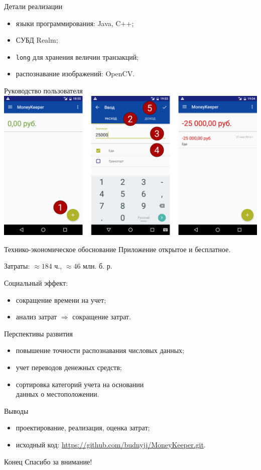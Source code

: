 \documentclass[hyperref={pdftex,unicode}]{beamer}
\begin{document}
\begin{frame}{Детали реализации}
  \begin{itemize}
    \item языки программирования: Java, C++;
    \item СУБД Realm;
    \item \texttt{long} для хранения величин транзакций;
    \item распознавание изображений: OpenCV.
  \end{itemize}
\end{frame}

\begin{frame}{Руководство пользователя}
  \centering
  \includegraphics[width=\textwidth]{fig/implementation_manual_balance_change.eps}
\end{frame}

\begin{frame}{Технико-экономическое обоснование}
  Приложение открытое и бесплатное.

  Затраты: \( \approx 184 \) ч., \( \approx 46 \) млн. б. р.

  \smallskip
  Социальный эффект:
  \begin{itemize}
  \item сокращение времени на учет;
  \item анализ затрат \( \Rightarrow \) сокращение затрат.
  \end{itemize}
\end{frame}

\begin{frame}{Перспективы развития}
  \begin{itemize}
  \item повышение точности распознавания числовых данных;
  \item учет переводов денежных средств;
  \item сортировка категорий учета на основании \\
    данных о местоположении.
  \end{itemize}
\end{frame}

\begin{frame}{Выводы}
  \begin{itemize}
  \item проектирование, реализация, оценка затрат;
  \item исходный код: \url{https://github.com/budnyjj/MoneyKeeper.git}.
  \end{itemize}
\end{frame}

\begin{frame}{Конец}
  \centering
  Спасибо за внимание!
\end{frame}
\end{document}
